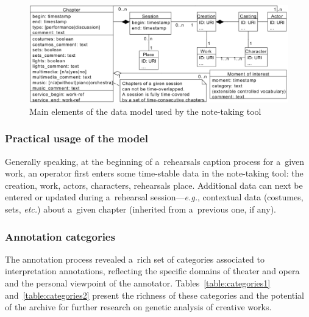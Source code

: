 \documentclass[conference]{IEEEtran}
\newcommand{\todo}[1]{\noindent\textcolor{red}{{\bf \{ToDo} #1{\bf \}}}}
\begin{document}
\begin{figure}[ht]
\centering
{
\includegraphics[width=0.95\linewidth]{UMLet_Data_modelvFullPagev3}	
\caption{Main elements of the data model used by the note-taking tool}
\label{fig_data_model}
}
\end{figure}


\subsubsection{Practical usage of the model} Generally speaking, at the beginning of a~rehearsals caption process for a~given work, an operator first enters some time-stable data in the note-taking tool: the creation, work, actors, characters, rehearsals place. Additional data can next be entered or updated during a~rehearsal session---\emph{e.g.}, contextual data (costumes, sets, \emph{etc.}) about a~given chapter (inherited from a~previous one, if any).

\subsubsection{Annotation categories}

The annotation process revealed a~rich set of categories associated to interpretation annotations, reflecting 
the  specific domains of theater and opera and the personal viewpoint of the annotator. Tables~\ref{table:categories1} and~\ref{table:categories2} present the richness of these categories and the potential of the archive for further research on genetic analysis of creative works.
\end{document}
